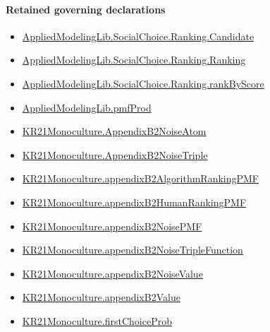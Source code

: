 \documentclass[10pt]{article}
\begin{document}
\paragraph{Retained governing declarations}
\begin{itemize}\raggedright
\item \hyperlink{library-prerequisite-8c0e6c25845ae78a}{Applied\allowbreak{}Modeling\allowbreak{}Lib.\allowbreak{}Social\allowbreak{}Choice.\allowbreak{}Ranking.\allowbreak{}Candidate}
\item \hyperlink{library-prerequisite-5cde54446d1ae021}{Applied\allowbreak{}Modeling\allowbreak{}Lib.\allowbreak{}Social\allowbreak{}Choice.\allowbreak{}Ranking.\allowbreak{}Ranking}
\item \hyperlink{governing-declaration-c2e98278351275b0}{Applied\allowbreak{}Modeling\allowbreak{}Lib.\allowbreak{}Social\allowbreak{}Choice.\allowbreak{}Ranking.\allowbreak{}rank\allowbreak{}By\allowbreak{}Score}
\item \hyperlink{governing-declaration-de8e2a8bfe221a38}{Applied\allowbreak{}Modeling\allowbreak{}Lib.\allowbreak{}pmf\allowbreak{}Prod}
\item \hyperlink{governing-declaration-a251de733d2f986a}{KR21\allowbreak{}Monoculture.\allowbreak{}Appendix\allowbreak{}B2\allowbreak{}Noise\allowbreak{}Atom}
\item \hyperlink{governing-declaration-5e2e57dad411ac3e}{KR21\allowbreak{}Monoculture.\allowbreak{}Appendix\allowbreak{}B2\allowbreak{}Noise\allowbreak{}Triple}
\item \hyperlink{governing-declaration-7611cbfbcc98aa61}{KR21\allowbreak{}Monoculture.\allowbreak{}appendix\allowbreak{}B2\allowbreak{}Algorithm\allowbreak{}Ranking\allowbreak{}PMF}
\item \hyperlink{governing-declaration-ca16c412ff86e21d}{KR21\allowbreak{}Monoculture.\allowbreak{}appendix\allowbreak{}B2\allowbreak{}Human\allowbreak{}Ranking\allowbreak{}PMF}
\item \hyperlink{governing-declaration-8e6ec30fddce1699}{KR21\allowbreak{}Monoculture.\allowbreak{}appendix\allowbreak{}B2\allowbreak{}Noise\allowbreak{}PMF}
\item \hyperlink{governing-declaration-60847befce1f016f}{KR21\allowbreak{}Monoculture.\allowbreak{}appendix\allowbreak{}B2\allowbreak{}Noise\allowbreak{}Triple\allowbreak{}Function}
\item \hyperlink{governing-declaration-c2e627e448258a0b}{KR21\allowbreak{}Monoculture.\allowbreak{}appendix\allowbreak{}B2\allowbreak{}Noise\allowbreak{}Value}
\item \hyperlink{governing-declaration-302704452f418635}{KR21\allowbreak{}Monoculture.\allowbreak{}appendix\allowbreak{}B2\allowbreak{}Value}
\item \hyperlink{governing-declaration-93eb0433da315974}{KR21\allowbreak{}Monoculture.\allowbreak{}first\allowbreak{}Choice\allowbreak{}Prob}
\end{itemize}
\end{document}
